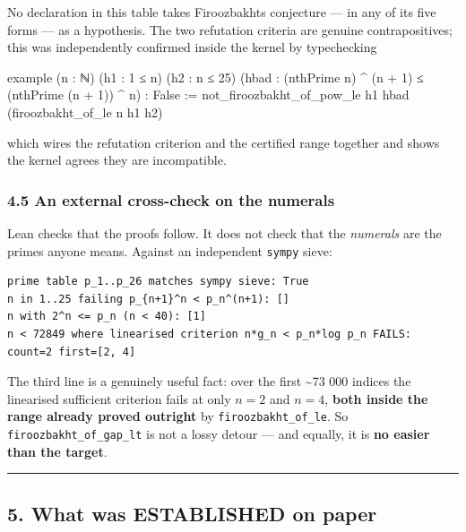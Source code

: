 \documentclass[
  a4paper,
  11pt]{article}
\newenvironment{Shaded}{}{}
\newcommand{\NormalTok}[1]{#1}
\begin{document}
No declaration in this table takes Firoozbakht\textquotesingle s
conjecture --- in any of its five forms --- as a hypothesis. The two
refutation criteria are genuine contrapositives; this was independently
confirmed inside the kernel by typechecking

\begin{Shaded}
\begin{Highlighting}[]
\NormalTok{example (n : ℕ) (h1 : 1 ≤ n) (h2 : n ≤ 25)}
\NormalTok{    (hbad : (nthPrime n) \^{} (n + 1) ≤ (nthPrime (n + 1)) \^{} n) : False :=}
\NormalTok{  not\_firoozbakht\_of\_pow\_le h1 hbad (firoozbakht\_of\_le n h1 h2)}
\end{Highlighting}
\end{Shaded}

which wires the refutation criterion and the certified range together
and shows the kernel agrees they are incompatible.

\subsubsection{4.5 An external cross-check on the
numerals}\label{45-an-external-cross-check-on-the-numerals}

Lean checks that the proofs follow. It does not check that the
\emph{numerals} are the primes anyone means. Against an independent
\texttt{sympy} sieve:

\begin{verbatim}
prime table p_1..p_26 matches sympy sieve: True
n in 1..25 failing p_{n+1}^n < p_n^(n+1): []
n with 2^n <= p_n (n < 40): [1]
n < 72849 where linearised criterion n*g_n < p_n*log p_n FAILS: count=2 first=[2, 4]
\end{verbatim}

The third line is a genuinely useful fact: over the first
\textasciitilde73 000 indices the linearised sufficient criterion fails
at only \(n = 2\) and \(n = 4\), \textbf{both inside the range already
proved outright} by \texttt{firoozbakht\_of\_le}. So
\texttt{firoozbakht\_of\_gap\_lt} is not a lossy detour --- and equally,
it is \textbf{no easier than the target}.

\begin{center}\rule{0.5\linewidth}{0.5pt}\end{center}

\subsection{5. What was ESTABLISHED on
paper}\label{5-what-was-established-on-paper}
\end{document}
